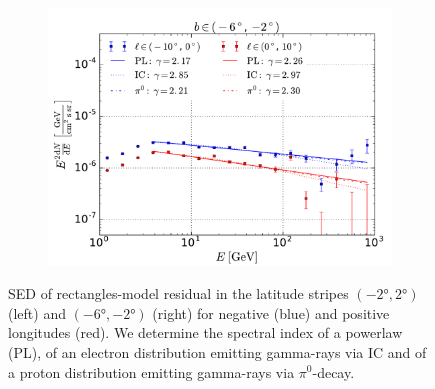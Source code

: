 \begin{figure}[h!]
\begin{subfigure}{0.49\textwidth}
    \end{subfigure} \\
    \begin{subfigure}{0.49\textwidth}
        \includegraphics[width=\textwidth]{plots/SED_boxes_source_-4.pdf}
    \end{subfigure}
  	\caption{SED of rectangles-model residual in the latitude stripes $(\ang{-2}, \ang{2})$ (left) and $(\ang{-6}, \ang{-2})$ (right) for negative (blue) and positive longitudes (red). We determine the spectral index of a powerlaw (PL), of an electron distribution emitting gamma-rays via IC and of a proton distribution emitting gamma-rays via $\pi^0$-decay.}
  	\label{fig:SED_with_fits}
\end{figure}


%

